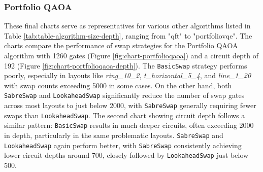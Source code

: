 \subsubsection{Portfolio QAOA}
These final charts serve as representatives for various other algorithms listed in Table \ref{tab:table-algorithm-size-depth}, ranging from "qft" to "portfoliovqe". The charts compare the performance of swap strategies for the Portfolio QAOA algorithm with 1260 gates (Figure \ref{fig:chart-portfolioqaoa}) and a circuit depth of 192 (Figure \ref{fig:chart-portfolioqaoa-depth}). The \lstinline{BasicSwap} strategy performs poorly, especially in layouts like \textit{ring\_10\_2}, \textit{t\_horizontal\_5\_4}, and \textit{line\_1\_20} with swap counts exceeding 5000 in some cases. On the other hand, both \lstinline{SabreSwap} and \lstinline{LookaheadSwap} significantly reduce the number of swap gates across most layouts to just below 2000, with \lstinline{SabreSwap} generally requiring fewer swaps than \lstinline{LookaheadSwap}. The second chart showing circuit depth follows a similar pattern: \lstinline{BasicSwap} results in much deeper circuits, often exceeding 2000 in depth, particularly in the same problematic layouts. \lstinline{SabreSwap} and \lstinline{LookaheadSwap} again perform better, with \lstinline{SabreSwap} consistently achieving lower circuit depths around 700, closely followed by \lstinline{LookaheadSwap} just below 500.
